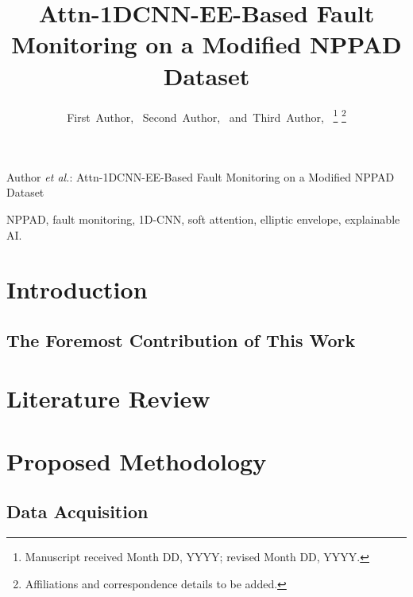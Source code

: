 \documentclass[lettersize,journal]{IEEEtran}
\begin{document}
\title{Attn-1DCNN-EE-Based Fault Monitoring on a Modified NPPAD Dataset}

\author{First~Author,~
        Second~Author,~
        and~Third~Author,~%
\thanks{Manuscript received Month DD, YYYY; revised Month DD, YYYY.}%
\thanks{Affiliations and correspondence details to be added.}}

%
{Author \MakeLowercase{\textit{et al.}}: Attn-1DCNN-EE-Based Fault Monitoring on a Modified NPPAD Dataset}

\maketitle

\begin{abstract}
\end{abstract}

\begin{IEEEkeywords}
NPPAD, fault monitoring, 1D-CNN, soft attention, elliptic envelope, explainable AI.
\end{IEEEkeywords}

\section{Introduction}

\subsection{The Foremost Contribution of This Work}

\section{Literature Review}

\section{Proposed Methodology}

\subsection{Data Acquisition}
\end{document}

